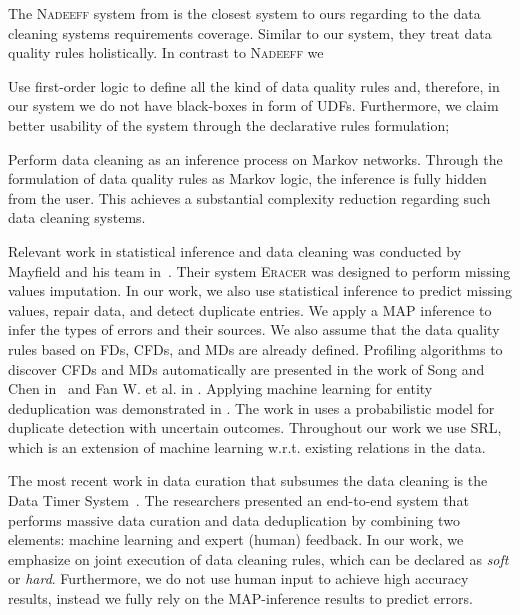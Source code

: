 The \textsc{Nadeeff} system from \cite{Dallachiesa:2013:NCD:2463676.2465327} is the closest system to ours regarding to the data cleaning systems requirements coverage. Similar to our system, they treat data quality rules holistically. In contrast to \textsc{Nadeeff} we 
\begin{inparaenum}[\itshape 1\upshape)]
	\item Use first-order logic to define all the kind of data quality rules and, therefore, in our system we do not have black-boxes in form of UDFs. Furthermore, we claim better usability of the system through the declarative rules formulation;
	\item Perform data cleaning as an inference process on Markov networks. Through the formulation of data quality rules as Markov logic, the inference is fully hidden from the user. This achieves a substantial complexity reduction regarding such data cleaning systems.
\end{inparaenum}  

Relevant work in statistical inference and data cleaning was conducted by Mayfield and his team in~\cite{Mayfield:2010:EDA:1807167.1807178}. Their system \textsc{Eracer} was designed to perform missing values imputation. In our work, we also use statistical inference to predict missing values, repair data, and detect duplicate entries. We apply a MAP inference to infer the types of errors and their sources. We also assume that the data quality rules based on FDs, CFDs, and MDs are already defined. Profiling algorithms to discover CFDs and MDs automatically are presented in the work of Song and Chen in~\cite{song2009discovering} and Fan W. et al. in \cite{Fan:2011:DCF:1978258.1978514}. Applying machine learning for entity deduplication was demonstrated in \cite{guo2010record}. The work in \cite{beskales2010probclean} uses a probabilistic model for duplicate detection with uncertain outcomes. Throughout our work we use SRL, which is an extension of machine learning w.r.t. existing relations in the data.

The most recent work in data curation that subsumes the data cleaning is the Data Timer System~\cite{Stonebraker_datacuration}. The researchers presented an end-to-end system that performs massive data curation and data deduplication by combining two elements: machine learning and expert (human) feedback. In our work, we emphasize on joint execution of data cleaning rules, which can be declared as \textit{soft} or \textit{hard}. Furthermore, we do not use human input to achieve high accuracy results, instead we fully rely on the MAP-inference results to predict errors. 

